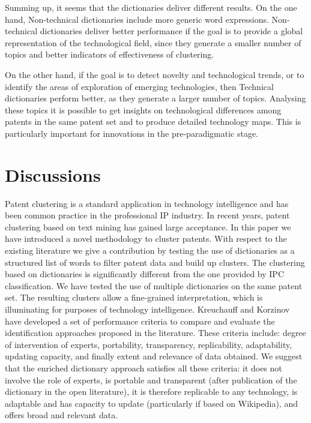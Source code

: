\documentclass[]{book}
\begin{document}
Summing up, it seems that the dictionaries deliver different results. On
the one hand, Non-technical dictionaries include more generic word
expressions. Non-technical dictionaries deliver better performance if
the goal is to provide a global representation of the technological
field, since they generate a smaller number of topics and better
indicators of effectiveness of clustering.

On the other hand, if the goal is to detect novelty and technological
trends, or to identify the areas of exploration of emerging
technologies, then Technical dictionaries perform better, as they
generate a larger number of topics. Analysing these topics it is
possible to get insights on technological differences among patents in
the same patent set and to produce detailed technology maps. This is
particularly important for innovations in the pre-paradigmatic stage.

\section{Discussions}\label{discussions}

Patent clustering is a standard application in technology intelligence
and has been common practice in the professional IP industry. In recent
years, patent clustering based on text mining has gained large
acceptance. In this paper we have introduced a novel methodology to
cluster patents. With respect to the existing literature we give a
contribution by testing the use of dictionaries as a structured list of
words to filter patent data and build up clusters. The clustering based
on dictionaries is significantly different from the one provided by IPC
classification. We have tested the use of multiple dictionaries on the
same patent set. The resulting clusters allow a fine-grained
interpretation, which is illuminating for purposes of technology
intelligence. Kreuchauff and Korzinov \citep{kreuchauff2017patent} have
developed a set of performance criteria to compare and evaluate the
identification approaches proposed in the literature. These criteria
include: degree of intervention of experts, portability, transparency,
replicability, adaptability, updating capacity, and finally extent and
relevance of data obtained. We suggest that the enriched dictionary
approach satisfies all these criteria: it does not involve the role of
experts, is portable and transparent (after publication of the
dictionary in the open literature), it is therefore replicable to any
technology, is adaptable and has capacity to update (particularly if
based on Wikipedia), and offers broad and relevant data.
\end{document}
